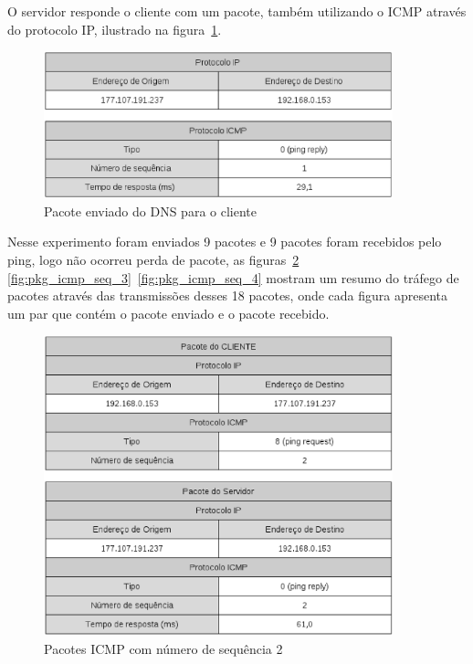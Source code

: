 O servidor responde o cliente com um pacote, também utilizando o ICMP
através do protocolo IP, ilustrado na figura~\ref{fig:pkg_server_to_client}.

    \begin{figure}[h]
      \centering
      \includegraphics[width=0.9\textwidth]{figuras/pkg_server_to_client.eps}
      \caption{Pacote enviado do DNS para o cliente}
      \label{fig:pkg_server_to_client}
    \end{figure}

Nesse experimento foram enviados 9 pacotes e 9 pacotes foram recebidos
pelo ping, logo não ocorreu perda de pacote, as figuras~\ref{fig:pkg_icmp_seq_2}
\ref{fig:pkg_icmp_seq_3}~\ref{fig:pkg_icmp_seq_4} mostram um resumo do
tráfego de pacotes através das transmissões desses 18 pacotes, onde cada
figura apresenta um par que contém o pacote enviado e o pacote recebido.

    \begin{figure}[h]
      \centering
      \includegraphics[width=0.9\textwidth]{figuras/pkg_icmp_seq_2.eps}
      \caption{Pacotes ICMP com número de sequência 2}
      \label{fig:pkg_icmp_seq_2}
    \end{figure}

